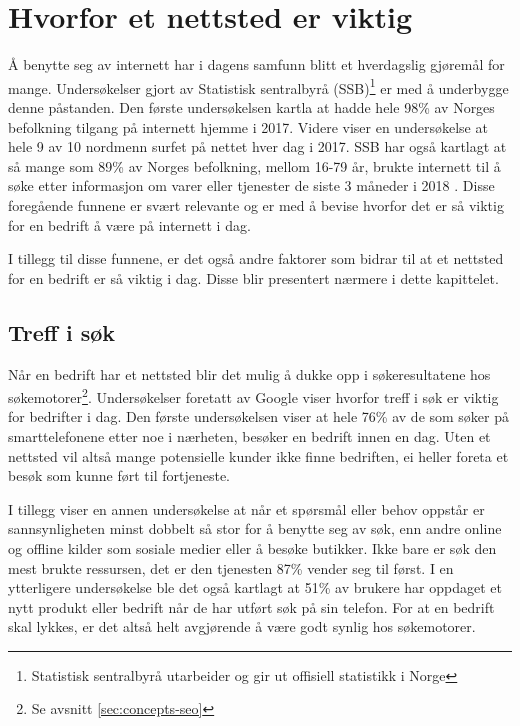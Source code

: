 \section{Hvorfor et nettsted er viktig}
Å benytte seg av internett har i dagens samfunn blitt et hverdagslig gjøremål for mange. Undersøkelser gjort av Statistisk sentralbyrå (SSB)\footnote{Statistisk sentralbyrå utarbeider og gir ut offisiell statistikk i Norge} er med å underbygge denne påstanden. Den første undersøkelsen \cite{ssb17fim} kartla at hadde hele 98\% av Norges befolkning tilgang på internett hjemme i 2017. Videre viser en undersøkelse \cite{ssb17nat} at hele 9 av 10 nordmenn surfet på nettet hver dag i 2017. SSB har også kartlagt  at så mange som 89\% av Norges befolkning, mellom 16-79 år, brukte internett til å søke etter informasjon om varer eller tjenester de siste 3 måneder i 2018 \cite{ssb18aup}. Disse foregående funnene er svært relevante og er med å bevise hvorfor det er så viktig for en bedrift å være på internett i dag.

I tillegg til disse funnene, er det også andre faktorer som bidrar til at et nettsted for en bedrift er så viktig i dag. Disse blir presentert nærmere i dette kapittelet. 

\subsection{Treff i søk}
\label{sec:search-results}
Når en bedrift har et nettsted blir det mulig å dukke opp i søkeresultatene hos søkemotorer\footnote{Se avsnitt \ref{sec:concepts-seo}}. Undersøkelser foretatt av Google viser hvorfor treff i søk er viktig for bedrifter i dag. Den første undersøkelsen \cite{google16hms} viser at hele 76\% av de som søker på smarttelefonene etter noe i nærheten, besøker en bedrift innen en dag. Uten et nettsted vil altså mange potensielle kunder ikke finne bedriften, ei heller foreta et besøk som kunne ført til fortjeneste. 

I tillegg viser en annen undersøkelse \cite{google16mhc} at når et spørsmål eller behov oppstår er sannsynligheten minst dobbelt så stor for å benytte seg av søk, enn andre online og offline kilder som sosiale medier eller å besøke butikker. Ikke bare er søk den mest brukte ressursen, det er den tjenesten 87\% vender seg til først. I en ytterligere undersøkelse  \cite{google16scp} ble det også kartlagt at 51\% av brukere har oppdaget et nytt produkt eller bedrift når de har utført søk på sin telefon. For at en bedrift skal lykkes, er det altså helt avgjørende å være godt synlig hos søkemotorer.


